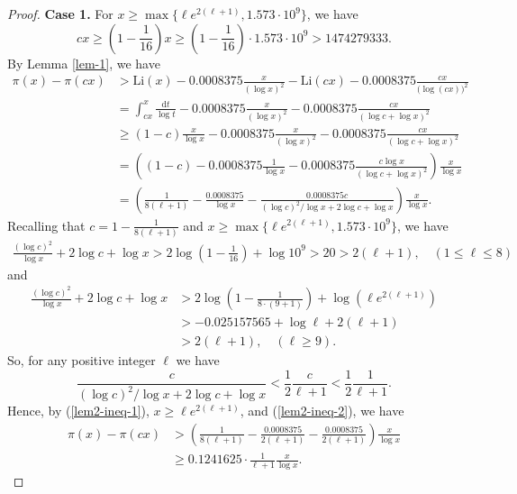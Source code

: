 \documentclass[10pt,a4paper]{amsart}
\def\Li{{\mathrm{Li}}}
\def\d{{\mathrm{d}}}
\begin{document}
\begin{proof}
 	\textbf{Case 1.}
 	For $x\geq \max\{\ell e^{2(\ell+1)},1.573\cdot 10^{9}\}$, we have 
 	$$
 	cx\geq \left( 1-\frac{1}{16} \right)x\geq \left( 1- \frac{1}{16}\right)\cdot 1.573\cdot 10^{9} > 1474279333.
 	$$
 	By Lemma \ref{lem-1}, we have
 	\begin{align}\label{lem2-ineq-1}
 		\pi(x)-\pi(cx)
 		&> \Li(x)-0.0008375\frac{x}{(\log x)^{2}}-\Li(cx)-0.0008375\frac{cx}{\big(\log (cx)\big)^{2}}\nonumber\\
 		&=\int_{cx}^{x}\frac{\d t}{\log t}-0.0008375\frac{x}{(\log x)^{2}}-0.0008375\frac{cx}{(\log c+\log x )^{2}}\nonumber\\
 		&\geq (1-c)\frac{x}{\log x}-0.0008375\frac{x}{(\log x)^{2}}-0.0008375\frac{cx}{(\log c+\log x)^{2}}\nonumber\\
 		&= \left( (1-c)-0.0008375\frac{1}{\log x}-0.0008375 \frac{c\log x}{(\log c+\log x)^{2}}\right)\frac{x}{\log x}\nonumber\\
 		&= \left( \frac{1}{8(\ell+1)}-\frac{0.0008375}{\log x}-\frac{0.0008375 c}{(\log c)^{2}/\log x+2\log c+\log x}\right)\frac{x}{\log x}.
 	\end{align}
 	Recalling that $c=1-\frac{1}{8(\ell+1)}$ and $x\geq \max\{\ell e^{2(\ell+1)},1.573\cdot 10^{9}\}$, we have 
 	\begin{align*}
 		\frac{(\log c)^{2}}{ \log x}+2\log c+ \log x
 		>2\log\left(1-\frac{1}{16}\right)+\log 10^{9}
 		>20
 		> 2 (\ell+1), \quad (1\leq \ell \leq 8)
 	\end{align*}
 	and
 	\begin{align*}
 		\frac{(\log c)^{2}}{\log x}+2\log c+ \log x 
 		&> 2\log \left(1-\frac{1}{8\cdot (9+1)}\right)+\log\left( \ell e^{2(\ell+1)} \right)\\
 		&>-0.025157565 +\log \ell+2(\ell+1)\\
 		&>2(\ell+1), \quad (\ell\geq 9).
 	\end{align*}
 	So, for any positive integer $\ell$ we have
 	\begin{equation}\label{lem2-ineq-2}
 		\frac{c}{(\log c)^{2}/\log x+2\log c+\log x}< \frac{1}{2} \frac{c}{ \ell+1}<\frac{1}{2}\frac{1}{\ell+1}.
 	\end{equation}
 	Hence, by (\ref{lem2-ineq-1}), $x\geq \ell e^{2(\ell+1)}$, and (\ref{lem2-ineq-2}), we have
 	\begin{align*}
 		\pi(x)-\pi(cx)
 		&> \left(\frac{1}{8(\ell+1)}-\frac{0.0008375}{2(\ell+1)}-\frac{0.0008375}{2(\ell+1)}\right)\frac{x}{\log x}\\
 		&\geq 0.1241625 \cdot \frac{1}{\ell+1}\frac{x}{\log x}.
 	\end{align*}
 	

\end{proof}
\end{document}
